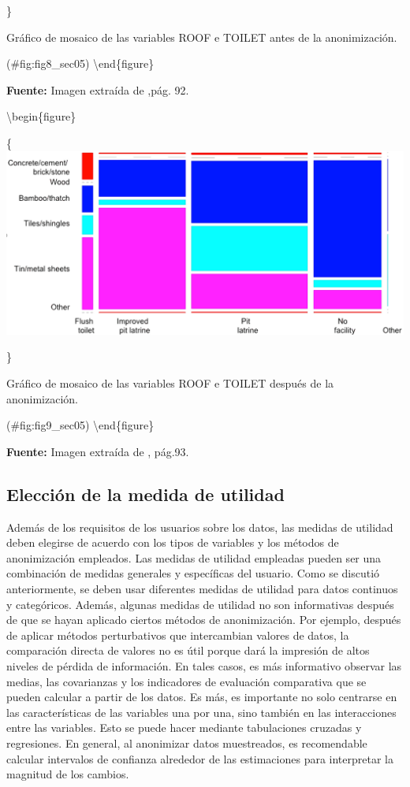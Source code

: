 \documentclass[]{book}
\theoremstyle{definition}
\theoremstyle{definition}
\theoremstyle{definition}
\theoremstyle{definition}
\theoremstyle{remark}
\begin{document}
\}

\caption{Gráfico de mosaico de las variables ROOF e TOILET antes de la anonimización.}

(\#fig:fig8\_sec05)
\textbackslash{}end\{figure\}

\textbf{Fuente:} Imagen extraída de \citep{benschop2021},pág. 92.

\textbackslash{}begin\{figure\}

\{\centering \includegraphics[width=0.9\linewidth]{Imagenes/fig9}

\}

\caption{Gráfico de mosaico de las variables ROOF e TOILET después de la anonimización.}

(\#fig:fig9\_sec05)
\textbackslash{}end\{figure\}

\textbf{Fuente:} Imagen extraída de \citep{benschop2021}, pág.93.

\hypertarget{elecciuxf3n-de-la-medida-de-utilidad}{%
\subsection{Elección de la medida de utilidad}\label{elecciuxf3n-de-la-medida-de-utilidad}}

Además de los requisitos de los usuarios sobre los datos, las medidas de utilidad deben elegirse de acuerdo con los tipos de variables y los métodos de anonimización empleados. Las medidas de utilidad empleadas pueden ser una combinación de medidas generales y específicas del usuario. Como se discutió anteriormente, se deben usar diferentes medidas de utilidad para datos continuos y categóricos. Además, algunas medidas de utilidad no son informativas después de que se hayan aplicado ciertos métodos de anonimización. Por ejemplo, después de aplicar
métodos perturbativos que intercambian valores de datos, la comparación directa de valores no es útil porque dará la impresión de altos niveles de pérdida de información. En tales casos, es más informativo observar
las medias, las covarianzas y los indicadores de evaluación comparativa que se pueden calcular a partir de los datos. Es más, es importante no solo centrarse en las características de las variables una por una, sino
también en las interacciones entre las variables. Esto se puede hacer mediante tabulaciones cruzadas y regresiones. En general, al anonimizar datos muestreados, es recomendable calcular intervalos de confianza
alrededor de las estimaciones para interpretar la magnitud de los cambios.
\end{document}
